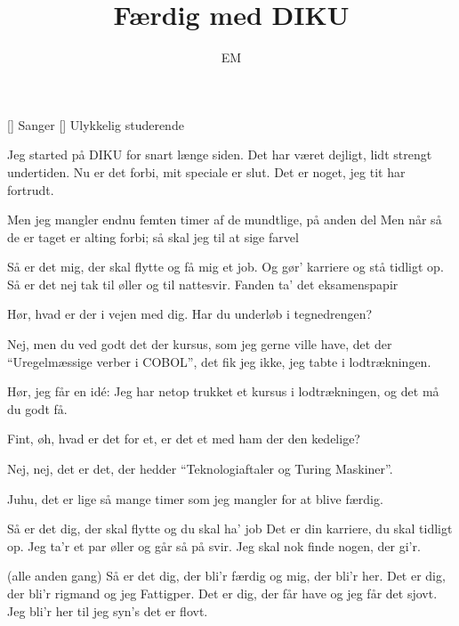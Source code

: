 \documentclass[a4paper,11pt]{article}
\title{Færdig med DIKU}
\author{EM}
\begin{document}
\maketitle

\begin{roles}
[] Sanger
[] Ulykkelig studerende
\end{roles}

\begin{song}
  Jeg started på DIKU
  for snart længe siden.
  Det har været dejligt,
  lidt strengt undertiden.
  Nu er det forbi,
  mit speciale er slut.
  Det er noget, jeg tit har fortrudt.

  Men jeg mangler endnu femten timer
  af de mundtlige, på anden del
  Men når så de er taget er alting forbi;
  så skal jeg til at sige farvel

  Så er det mig, der skal flytte
  og få mig et job.
  Og gør' karriere
  og stå tidligt op.
  Så er det nej tak til øller
  og til nattesvir.
  Fanden ta' det eksamenspapir
\end{song}

\begin{sketch}

 Hør, hvad er der i vejen med dig.  Har du underløb i tegnedrengen?

 Nej, men du ved godt det der kursus, som jeg gerne ville
have, det der "`Uregelmæssige verber i COBOL"', det fik jeg ikke, jeg
tabte i lodtrækningen.

 Hør, jeg får en idé: Jeg har netop trukket et kursus i
lodtrækningen, og det må du godt få.

 Fint, øh, hvad er det for et, er det et med ham der den
kedelige?

 Nej, nej, det er det, der hedder "`Teknologiaftaler og Turing
Maskiner"'.

 Juhu, det er lige så mange timer som jeg mangler for at
blive færdig.
\end{sketch}

\begin{song}
Så er det dig, der skal flytte
og du skal ha' job
Det er din karriere,
du skal tidligt op.
Jeg ta'r et par øller
og går så på svir.
Jeg skal nok finde nogen, der gi'r.

{\scene(alle anden gang)}
Så er det dig, der bli'r færdig
og mig, der bli'r her.
Det er dig, der bli'r rigmand
og jeg Fattigper.
Det er dig, der får have
og jeg får det sjovt.
Jeg bli'r her til jeg syn's det er flovt.
\end{song}
\end{document}

